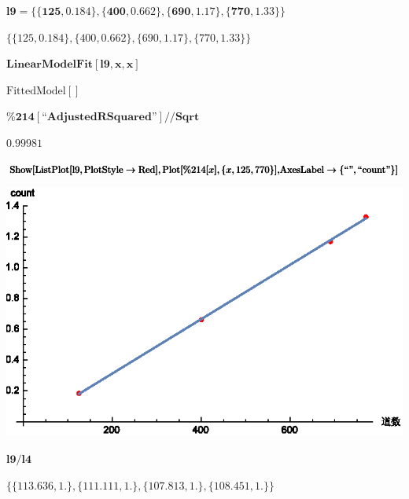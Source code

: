 \documentclass{article}
\newcommand{\unicode}[1]{{}}
\begin{document}
\begin{doublespace}
\noindent\(\pmb{\text{l9}=\{\{125,0.184\},\{400,0.662\},\{690,1.17\},\{770,1.33\}\}}\)
\end{doublespace}

\begin{doublespace}
\noindent\(\{\{125,0.184\},\{400,0.662\},\{690,1.17\},\{770,1.33\}\}\)
\end{doublespace}

\begin{doublespace}
\noindent\(\pmb{\text{LinearModelFit}[\text{l9},x,x]}\)
\end{doublespace}

\begin{doublespace}
\noindent\(\text{FittedModel}[]\)
\end{doublespace}

\begin{doublespace}
\noindent\(\pmb{\text{$\%$214}[\text{{``}AdjustedRSquared{''}}]\text{//}\text{Sqrt}}\)
\end{doublespace}

\begin{doublespace}
\noindent\(0.99981\)
\end{doublespace}

\begin{doublespace}
\noindent\(\pmb{\text{Show}[\text{ListPlot}[\text{l9},\text{PlotStyle}\to \text{Red}],\text{Plot}[\text{$\%$214}[x],\{x,125,770\}],}\\
\pmb{\text{AxesLabel}\to \{\text{{``}$\unicode{9053}\unicode{6570}${''}},\text{{``}count{''}}\}]}\)
\end{doublespace}

\includegraphics{data_gr9.eps}

\begin{doublespace}
\noindent\(\pmb{\text{l9}/\text{l4}}\)
\end{doublespace}

\begin{doublespace}
\noindent\(\{\{113.636,1.\},\{111.111,1.\},\{107.813,1.\},\{108.451,1.\}\}\)
\end{doublespace}
\end{document}
